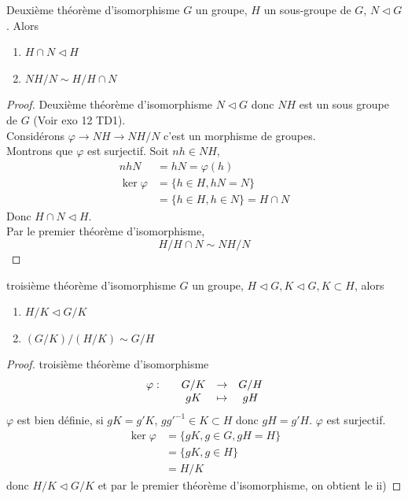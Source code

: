 \documentclass[]{report}
\begin{document}
\begin{tm}{Deuxième théorème d'isomorphisme}{}
    $G$ un groupe, $H$ un sous-groupe de $G$, $N\triangleleft G$. Alors
    \begin{enumerate}[label=\roman*]
        \item $H\cap N\triangleleft H$
        \item $NH/N\sim H/H\cap N$
    \end{enumerate}
\end{tm}

\begin{proof}{Deuxième théorème d'isomorphisme}{}
    $N\triangleleft G$ donc $NH$ est un sous groupe de $G$ (Voir exo 12 TD1).\\
    Considérons $\varphi \to NH \to NH/N$ c'est un morphisme de groupes.\\
    Montrons que $\varphi$ est surjectif. Soit $nh\in NH$,
    \begin{align*}
        nhN&=hN=\varphi(h)\\
        \ker \varphi&=\{h\in H, hN=N\}\\
        &=\{h\in H,h\in N\}= H\cap N
    \end{align*}
    Donc $H\cap N\triangleleft H$.\\
    Par le premier théorème d'isomorphisme,
    \[H/H\cap N\sim NH/N\]
\end{proof}

\begin{tm}{troisième théorème d'isomorphisme}{}
    $G$ un groupe, $H\triangleleft G,K\triangleleft G,K\subset H$, alors
    \begin{enumerate}[label=\roman*]
        \item $H/K\triangleleft G/K$
        \item $(G/K)/(H/K)\sim G/H$
    \end{enumerate}
\end{tm}

\begin{proof}{troisième théorème d'isomorphisme}{}
    \[\begin{array}{ccccc} \varphi : & & G/K & \to & G/H \\ & & gK & \mapsto & gH \end{array}\]
    $\varphi$ est bien définie, si $gK=g'K$, $gg'^{-1}\in K \subset H$ donc $gH=g'H$. $\varphi$ est surjectif.
    \begin{align*}
        \ker \varphi&= \{gK,g\in G, gH=H\}\\
        &=\{gK,g\in H\}\\
        &=H/K
    \end{align*}
    donc $H/K\triangleleft G/K$ et par le premier théorème d'isomorphisme, on obtient le ii)
\end{proof}
\end{document}

